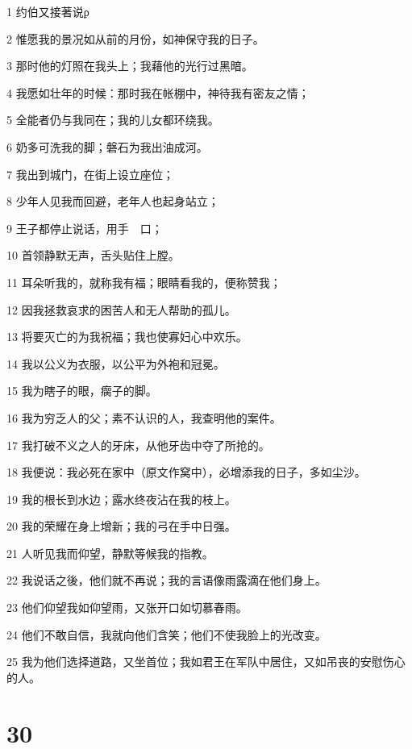 \par 1 约伯又接著说ϼ
\par 2 惟愿我的景况如从前的月份，如神保守我的日子。
\par 3 那时他的灯照在我头上；我藉他的光行过黑暗。
\par 4 我愿如壮年的时候：那时我在帐棚中，神待我有密友之情；
\par 5 全能者仍与我同在；我的儿女都环绕我。
\par 6 奶多可洗我的脚；磐石为我出油成河。
\par 7 我出到城门，在街上设立座位；
\par 8 少年人见我而回避，老年人也起身站立；
\par 9 王子都停止说话，用手　口；
\par 10 首领静默无声，舌头贴住上膛。
\par 11 耳朵听我的，就称我有福；眼睛看我的，便称赞我；
\par 12 因我拯救哀求的困苦人和无人帮助的孤儿。
\par 13 将要灭亡的为我祝福；我也使寡妇心中欢乐。
\par 14 我以公义为衣服，以公平为外袍和冠冕。
\par 15 我为瞎子的眼，瘸子的脚。
\par 16 我为穷乏人的父；素不认识的人，我查明他的案件。
\par 17 我打破不义之人的牙床，从他牙齿中夺了所抢的。
\par 18 我便说：我必死在家中（原文作窝中），必增添我的日子，多如尘沙。
\par 19 我的根长到水边；露水终夜沾在我的枝上。
\par 20 我的荣耀在身上增新；我的弓在手中日强。
\par 21 人听见我而仰望，静默等候我的指教。
\par 22 我说话之後，他们就不再说；我的言语像雨露滴在他们身上。
\par 23 他们仰望我如仰望雨，又张开口如切慕春雨。
\par 24 他们不敢自信，我就向他们含笑；他们不使我脸上的光改变。
\par 25 我为他们选择道路，又坐首位；我如君王在军队中居住，又如吊丧的安慰伤心的人。

\chapter{30}


